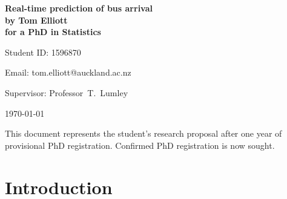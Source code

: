 \documentclass[12pt,a4paper]{article}
\begin{document}
\begin{Large}
\begin{center}
\textbf{Real-time prediction of bus arrival} \\
\textbf{by Tom Elliott} \\
\textbf{for a PhD in Statistics}
\end{center}
\end{Large}


\hfill{Student ID: 1596870}

\hfill{Email: tom.elliott@auckland.ac.nz}

Supervisor: Professor~T.~Lumley





\begin{center}
\today
\end{center}


This document represents the student's research proposal after
one year of provisional PhD registration.
Confirmed PhD registration is now sought.




\section{Introduction}
\label{sec:intro}








\end{document}
